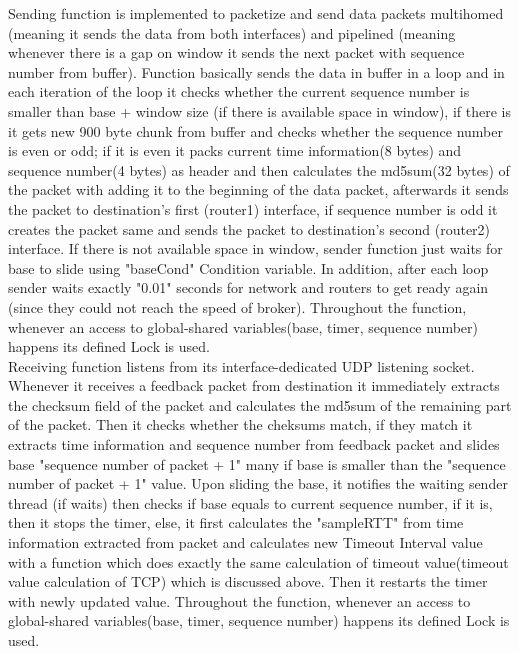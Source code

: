 \documentclass[conference]{IEEEtran}
\begin{document}
Sending function is implemented to packetize and send data packets multihomed (meaning it sends the data from both interfaces) and pipelined (meaning whenever there is a gap on window it sends the next packet with sequence number from buffer). Function basically sends the data in buffer in a loop and in each iteration of the loop it checks whether the current sequence number is smaller than base + window size (if there is available space in window), if there is it gets new 900 byte chunk from buffer and checks whether the sequence number is even or odd; if it is even it packs current time information(8 bytes) and sequence number(4 bytes) as header and then calculates the md5sum(32 bytes) of the packet with adding it to the beginning of the data packet, afterwards it sends the packet to destination's first (router1) interface, if sequence number is odd it creates the packet same and sends the packet to destination's second (router2) interface. If there is not available space in window, sender function just waits for base to slide using "baseCond" Condition variable. In addition, after each loop sender waits exactly "0.01" seconds for network and routers to get ready again (since they could not reach the speed of broker). Throughout the function, whenever an access to global-shared variables(base, timer, sequence number) happens its defined Lock is used. \\

Receiving function listens from its interface-dedicated UDP listening socket. Whenever it receives a feedback packet from destination it immediately extracts the checksum field of the packet and calculates the md5sum of the remaining part of the packet. Then it checks whether the cheksums match, if they match it extracts time information and sequence number from feedback packet and slides base "sequence number of packet + 1" many if base is smaller than the "sequence number of packet + 1" value. Upon sliding the base, it notifies the waiting sender thread (if waits) then checks if base equals to current sequence number, if it is, then it stops the timer, else, it first calculates the "sampleRTT" from time information extracted from packet and calculates new Timeout Interval value with a function which does exactly the same calculation of timeout value(timeout value calculation of TCP) which is discussed above. Then it restarts the timer with newly updated value. Throughout the function, whenever an access to global-shared variables(base, timer, sequence number) happens its defined Lock is used. \\
\end{document}
